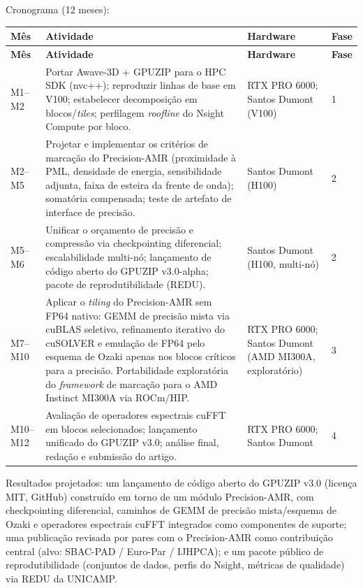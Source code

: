 \documentclass[12pt,a4paper]{article}
\begin{document}
Cronograma (12 meses):

\begin{longtable}{@{}p{}p{}p{}p{}@{}}
\toprule
\textbf{Mês} & \textbf{Atividade} & \textbf{Hardware} & \textbf{Fase}\\
\midrule
\endfirsthead
\toprule
\textbf{Mês} & \textbf{Atividade} & \textbf{Hardware} & \textbf{Fase}\\
\midrule
\endhead
\bottomrule
\endfoot
M1--M2 & Portar Awave-3D + GPUZIP para o HPC SDK (nvc++); reproduzir linhas de
base em V100; estabelecer decomposição em blocos/\emph{tiles}; perfilagem
\emph{roofline} do Nsight Compute por bloco. & RTX PRO 6000; Santos Dumont
(V100) & 1\\
\addlinespace
M2--M5 & Projetar e implementar os critérios de marcação do Precision-AMR
(proximidade à PML, densidade de energia, sensibilidade adjunta, faixa de
esteira da frente de onda); somatória compensada; teste de artefato de
interface de precisão. & Santos Dumont (H100) & 2\\
\addlinespace
M5--M6 & Unificar o orçamento de precisão e compressão via checkpointing
diferencial; escalabilidade multi-nó; lançamento de código aberto do GPUZIP
v3.0-alpha; pacote de reprodutibilidade (REDU). & Santos Dumont (H100,
multi-nó) & 2\\
\addlinespace
M7--M10 & Aplicar o \emph{tiling} do Precision-AMR sem FP64 nativo: GEMM de
precisão mista via cuBLAS seletivo, refinamento iterativo do cuSOLVER e
emulação de FP64 pelo esquema de Ozaki apenas nos blocos críticos para a
precisão. Portabilidade exploratória do \emph{framework} de marcação para o
AMD Instinct MI300A via ROCm/HIP. & RTX PRO 6000; Santos Dumont (AMD MI300A,
exploratório) & 3\\
\addlinespace
M10--M12 & Avaliação de operadores espectrais cuFFT em blocos selecionados;
lançamento unificado do GPUZIP v3.0; análise final, redação e submissão do
artigo. & RTX PRO 6000; Santos Dumont & 4\\
\end{longtable}

Resultados projetados: um lançamento de código aberto do GPUZIP v3.0
(licença MIT, GitHub) construído em torno de um módulo Precision-AMR, com
checkpointing diferencial, caminhos de GEMM de precisão mista/esquema de
Ozaki e operadores espectrais cuFFT integrados como componentes de suporte;
uma publicação revisada por pares com o Precision-AMR como contribuição
central (alvo: SBAC-PAD / Euro-Par / IJHPCA); e um pacote público de
reprodutibilidade (conjuntos de dados, perfis do Nsight, métricas de
qualidade) via REDU da UNICAMP.
\end{document}
